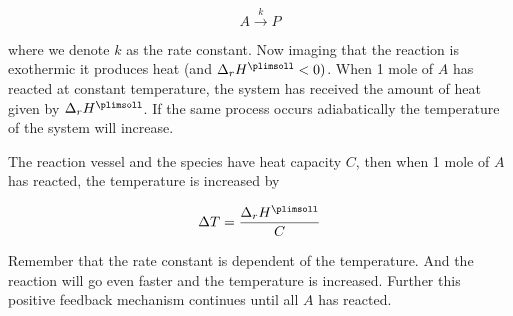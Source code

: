 \begin{equation}
    A \overset{k}{\rightarrow} P
\end{equation}

where we denote $k$ as the rate constant. Now imaging that the reaction is exothermic \ie it produces heat (and $\Delta_r H^\plimsoll < 0)$. When 1 mole of $A$ has reacted at constant temperature, the system has received the amount of heat given by $\Delta_r H^\plimsoll$. If the same process occurs adiabatically the temperature of the system will increase.

The reaction vessel and the species have heat capacity $C$, then when 1 mole of $A$ has reacted, the temperature is increased by

\begin{equation}
    \Delta T = \frac{\Delta_r H^\plimsoll}{C}
\end{equation}

Remember that the rate constant is dependent of the temperature. And the reaction will go even faster and the temperature is increased. Further this positive feedback mechanism continues until all $A$ has reacted.